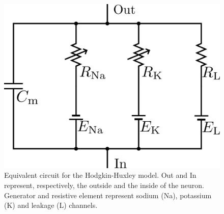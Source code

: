 \documentclass[a4paper, 12pt, twoside, openright]{book}
\begin{document}
\begin{figure}[H]
    \centering
    \includegraphics[width=0.5\columnwidth]{figures/HH_circuit.png}
    \caption{Equivalent circuit for the Hodgkin-Huxley model. Out and In represent, respectively, the outside and the inside of the neuron. Generator and resistive element represent sodium (Na), potassium (K) and leakage (L) channels.}
    \label{fig:HH_circuit_scheme}
\end{figure}
\end{document}
